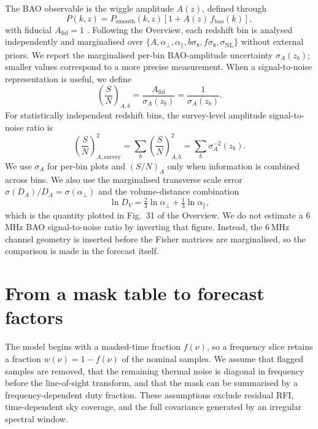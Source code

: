 The BAO observable is the wiggle amplitude $A(z)$, defined through
\begin{equation}
\label{eq:wiggle}
P(k,z) = P_\mathrm{smooth}(k,z)\left[1 + A(z)\,f_\mathrm{bao}(k)\right],
\end{equation}
with fiducial $A_\mathrm{fid}=1$ \citep{SeoEisenstein2007,Bull2015}.
Following the Overview, each redshift bin is analysed independently and
marginalised over $\{A,\alpha_\perp,\alpha_\parallel,b\sigma_8,
f\sigma_8,\sigma_\mathrm{NL}\}$ without external priors. We report the
marginalised per-bin BAO-amplitude uncertainty $\sigma_A(z_b)$; smaller
values correspond to a more precise measurement. When a signal-to-noise
representation is useful, we define
\begin{equation}
\label{eq:snr-bin}
\left(\frac{S}{N}\right)_{\!A,b} =
\frac{A_\mathrm{fid}}{\sigma_A(z_b)} = \frac{1}{\sigma_A(z_b)}.
\end{equation}
For statistically independent redshift bins, the survey-level amplitude
signal-to-noise ratio is
\begin{equation}
\label{eq:snr-survey}
\left(\frac{S}{N}\right)_{\!A,\mathrm{survey}}^{2} =
\sum_b \left(\frac{S}{N}\right)_{\!A,b}^{2} =
\sum_b \sigma_A^{-2}(z_b).
\end{equation}
We use $\sigma_A$ for per-bin plots and $(S/N)_A$ only when information
is combined across bins. We also use the marginalised transverse scale
error $\sigma(D_A)/D_A = \sigma(\alpha_\perp)$ and the volume-distance
combination
\begin{equation}
\label{eq:dv}
\ln D_V = \tfrac{2}{3}\ln\alpha_\perp + \tfrac{1}{3}\ln\alpha_\parallel,
\end{equation}
which is the quantity plotted in Fig.~31 of the Overview. We do not
estimate a 6\,MHz BAO signal-to-noise ratio by inverting that figure.
Instead, the 6\,MHz channel geometry is inserted before the Fisher
matrices are marginalised, so the comparison is made in the forecast
itself.

\section{From a mask table to forecast factors}
\label{sec:mapping}

The model begins with a masked-time fraction $f(\nu)$, so a frequency
slice retains a fraction $w(\nu)=1-f(\nu)$ of the nominal samples. We
assume that flagged samples are removed, that the remaining thermal
noise is diagonal in frequency before the line-of-sight transform, and
that the mask can be summarised by a frequency-dependent duty fraction.
These assumptions exclude residual RFI, time-dependent sky coverage, and
the full covariance generated by an irregular spectral window.

